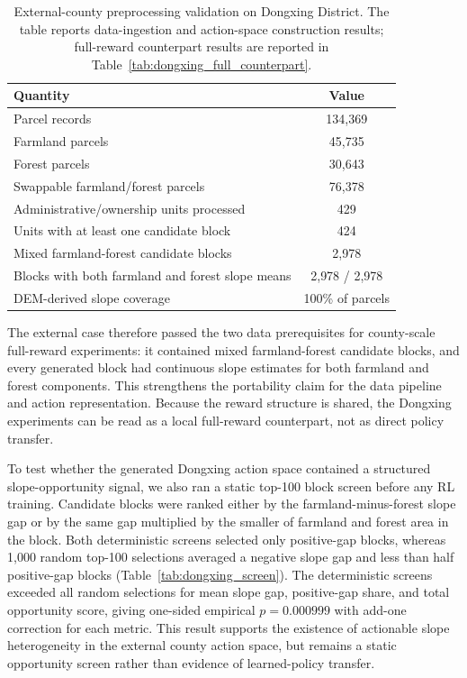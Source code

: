 \documentclass[11pt]{article}
\begin{document}
\begin{table}[htbp]
\centering
\caption{External-county preprocessing validation on Dongxing District. The table reports data-ingestion and action-space construction results; full-reward counterpart results are reported in Table~\ref{tab:dongxing_full_counterpart}.}
\label{tab:dongxing_external}
\begin{tabular}{lc}
\toprule
Quantity & Value \\
\midrule
Parcel records & 134{,}369 \\
Farmland parcels & 45{,}735 \\
Forest parcels & 30{,}643 \\
Swappable farmland/forest parcels & 76{,}378 \\
Administrative/ownership units processed & 429 \\
Units with at least one candidate block & 424 \\
Mixed farmland-forest candidate blocks & 2{,}978 \\
Blocks with both farmland and forest slope means & 2{,}978 / 2{,}978 \\
DEM-derived slope coverage & 100\% of parcels \\
\bottomrule
\end{tabular}
\end{table}

The external case therefore passed the two data prerequisites for county-scale full-reward experiments: it contained mixed farmland-forest candidate blocks, and every generated block had continuous slope estimates for both farmland and forest components. This strengthens the portability claim for the data pipeline and action representation. Because the reward structure is shared, the Dongxing experiments can be read as a local full-reward counterpart, not as direct policy transfer.

To test whether the generated Dongxing action space contained a structured slope-opportunity signal, we also ran a static top-100 block screen before any RL training. Candidate blocks were ranked either by the farmland-minus-forest slope gap or by the same gap multiplied by the smaller of farmland and forest area in the block. Both deterministic screens selected only positive-gap blocks, whereas 1{,}000 random top-100 selections averaged a negative slope gap and less than half positive-gap blocks (Table~\ref{tab:dongxing_screen}). The deterministic screens exceeded all random selections for mean slope gap, positive-gap share, and total opportunity score, giving one-sided empirical $p=0.000999$ with add-one correction for each metric. This result supports the existence of actionable slope heterogeneity in the external county action space, but remains a static opportunity screen rather than evidence of learned-policy transfer.
\end{document}
